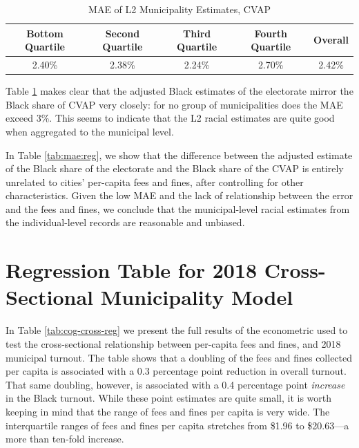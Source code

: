 \documentclass[
  12pt,
]{article}
\begin{document}
\begin{singlespace}
\begin{table}[H]

\caption{\label{tab:mae-chunck}\label{tab:mae} MAE of L2 Municipality Estimates, CVAP}
\centering
\begin{tabular}[t]{ccccc}
\toprule
Bottom Quartile & Second Quartile & Third Quartile & Fourth Quartile & Overall\\
\midrule
2.40\% & 2.38\% & 2.24\% & 2.70\% & 2.42\%\\
\bottomrule
\end{tabular}
\end{table}
\end{singlespace}

Table \ref{tab:mae} makes clear that the adjusted Black estimates of the electorate mirror the Black share of CVAP very closely: for no group of municipalities does the MAE exceed 3\%. This seems to indicate that the L2 racial estimates are quite good when aggregated to the municipal level.

In Table \ref{tab:mae:reg}, we show that the difference between the adjusted estimate of the Black share of the electorate and the Black share of the CVAP is entirely unrelated to cities' per-capita fees and fines, after controlling for other characteristics. Given the low MAE and the lack of relationship between the error and the fees and fines, we conclude that the municipal-level racial estimates from the individual-level records are reasonable and unbiased.

\begin{singlespace}

\end{singlespace}

\hypertarget{regression-table-for-2018-cross-sectional-municipality-model}{%
\section*{Regression Table for 2018 Cross-Sectional Municipality Model}\label{regression-table-for-2018-cross-sectional-municipality-model}}

In Table \ref{tab:cog-cross-reg} we present the full results of the econometric used to test the cross-sectional relationship between per-capita fees and fines, and 2018 municipal turnout. The table shows that a doubling of the fees and fines collected per capita is associated with a 0.3 percentage point reduction in overall turnout. That same doubling, however, is associated with a 0.4 percentage point \emph{increase} in the Black turnout. While these point estimates are quite small, it is worth keeping in mind that the range of fees and fines per capita is very wide. The interquartile ranges of fees and fines per capita stretches from \$1.96 to \$20.63---a more than ten-fold increase.
\end{document}
